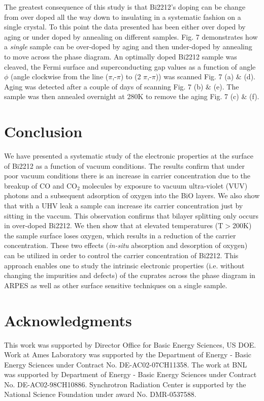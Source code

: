\documentclass[aps,twocolumn,amsmath,amssymb,showpacs,prb,
superscriptaddress,unsortedaddress]{revtex4}
\begin{document}
The greatest consequence of this study is that Bi2212's doping can be
change from over doped all the way down to insulating in a systematic
fashion on a single crystal. To this point the data presented has been
either over doped by aging or under doped by annealing on different
samples.  Fig. 7 demonstrates how a \textit{single} sample can be
over-doped by aging and then under-doped by annealing to move across
the phase diagram. An optimally doped Bi2212 sample was cleaved, the
Fermi surface and superconducting gap values as a function of angle
$\phi$ (angle clockwise from the line ($\pi$,-$\pi$) to (2
$\pi$,-$\pi$)) was scanned Fig. 7 (a) $\&$ (d).  Aging was detected
after a couple of days of scanning Fig. 7 (b) $\&$ (e).  The sample
was then annealed overnight at 280K to remove the aging Fig. 7 (c)
$\&$ (f).

\section{Conclusion}

We have presented a systematic study of the electronic properties at
the surface of Bi2212 as a function of vacuum conditions.  The results
confirm that under poor vacuum conditions there is an increase in
carrier concentration due to the breakup of CO and CO$_2$ molecules by
exposure to vacuum ultra-violet (VUV) photons and a subsequent
adsorption of oxygen into the BiO layers. We also show that with a UHV
leak a sample can increase its carrier concentration just by sitting
in the vaccum.  This observation confirms that bilayer splitting only
occurs in over-doped Bi2212. We then show that at elevated
temperatures (T$>$200K) the sample surface loses oxygen, which results
in a reduction of the carrier concentration.  These two effects
(\textit{in-situ} absorption and desorption of oxygen) can be utilized
in order to control the carrier concentration of Bi2212. This approach
enables one to study the intrinsic electronic properties (i.e. without
changing the impurities and defects) of the cuprates across the phase
diagram in ARPES as well as other surface sensitive techniques on a
single sample.

\section{Acknowledgments}

This work was supported by Director Office for Basic Energy Sciences,
US DOE. Work at Ames Laboratory was supported by the Department of
Energy - Basic Energy Sciences under Contract No. DE-AC02-07CH11358. 
The work at BNL was supported by Department of Energy - Basic Energy
Sciences under Contract No. DE-AC02-98CH10886. Synchrotron Radiation
Center is supported by the National Science Foundation under award No.
DMR-0537588.
\end{document}
